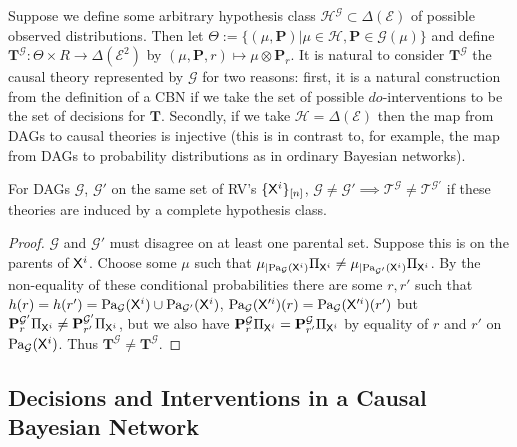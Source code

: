 Suppose we define some arbitrary hypothesis class $\mathscr{H}^{\mathcal{G}}\subset\Delta(\mathcal{E})$ of possible observed distributions. Then let $\Theta:=\{(\mu,\mathbf{P})|\mu\in\mathscr{H},\mathbf{P}\in \mathcal{G}(\mu)\}$ and define $\mathbf{T}^\mathscr{G}:\Theta\times R \to \Delta(\mathcal{E}^2)$ by $(\mu,\mathbf{P},r)\mapsto \mu\otimes \mathbf{P}_r$. It is natural to consider $\mathbf{T}^\mathscr{G}$ the causal theory represented by $\mathcal{G}$ for two reasons: first, it is a natural construction from the definition of a CBN if we take the set of possible $do$-interventions to be the set of decisions for $\mathbf{T}$. Secondly, if we take $\mathscr{H}=\Delta(\mathcal{E})$ then the map from DAGs to causal theories is injective (this is in contrast to, for example, the map from DAGs to probability distributions as in ordinary Bayesian networks\citep{bishop_pattern_2006}).

\begin{theorem}
For DAGs $\mathcal{G}$, $\mathcal{G}'$ on the same set of RV's $\{\mathsf{X}^i\}_{[n]}$, $\mathcal{G}\neq \mathcal{G}'\implies \mathscr{T}^{\mathcal{G}}\neq \mathscr{T}^{\mathcal{G}'}$ if these theories are induced by a complete hypothesis class.
\end{theorem}

\begin{proof}
$\mathcal{G}$ and $\mathcal{G}'$ must disagree on at least one parental set. Suppose this is on the parents of $\mathsf{X}^i$. Choose some $\mu$ such that $\mu_{|\text{Pa}_{\mathcal{G}}(\mathsf{X}^i)}\Pi_{\mathsf{X}^i} \neq  \mu_{|\text{Pa}_{\mathcal{G}'}(\mathsf{X}^i)}\Pi_{\mathsf{X}^i}$. By the non-equality of these conditional probabilities there are some $r,r'$ such that $h(r) = h(r') = \text{Pa}_{\mathcal{G}}(\mathsf{X}^i)\cup \text{Pa}_{\mathcal{G}'}(\mathsf{X}^i)$, $\text{Pa}_{\mathcal{G}}(\mathsf{X}'^i)(r) = \text{Pa}_{\mathcal{G}}(\mathsf{X}'^i)(r')$ but $\mathbf{P}^{\mathcal{G}'}_r \Pi_{\mathsf{X}^i} \neq \mathbf{P}^{\mathcal{G}'}_{r'} \Pi_{\mathsf{X}^i}$, but we also have $\mathbf{P}^{\mathcal{G}}_r \Pi_{\mathsf{X}^i} = \mathbf{P}^{\mathcal{G}}_{r'} \Pi_{\mathsf{X}^i}$ by equality of $r$ and $r'$ on $\text{Pa}_{\mathcal{G}}(\mathsf{X}^i)$. Thus $\mathbf{T}^\mathcal{G}\neq \mathbf{T}^\mathcal{G}$.
\end{proof}

\subsection{Decisions and Interventions in a Causal Bayesian Network}

